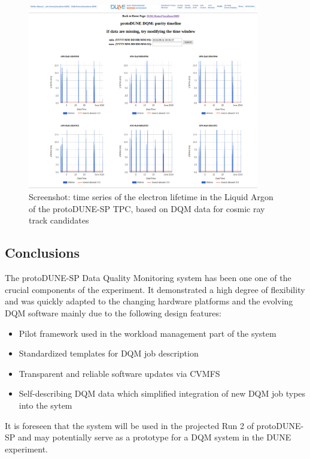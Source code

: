 \documentclass{webofc}
\newcommand{\pd}{protoDUNE\xspace}
\begin{document}
\begin{figure}[h]
\centering
\includegraphics[width=0.9\textwidth,clip]{figures/purity2019.png}
\caption{Screenshot: time series of the electron lifetime in the Liquid Argon of the protoDUNE-SP TPC, based on
DQM data for cosmic ray track candidates}
\label{fig:purity}
\end{figure}

\subsection{Conclusions}

The \pd-SP Data Quality Monitoring system has been one one of the crucial components of the experiment.
It demonstrated a high degree of flexibility and was quickly adapted to the changing hardware platforms and
the evolving DQM software mainly due to the following design features:
\begin{itemize}
\item Pilot framework used in the workload management part of the system
\item Standardized templates for DQM job description
\item Transparent and reliable software updates via CVMFS
\item Self-describing DQM data which simplified integration of new DQM job types into the sytem
\end{itemize}

\noindent It is foreseen that the system will be used in the projected Run 2 of \pd-SP and may potentially
serve as a prototype for a DQM system in the DUNE experiment.
\end{document}

